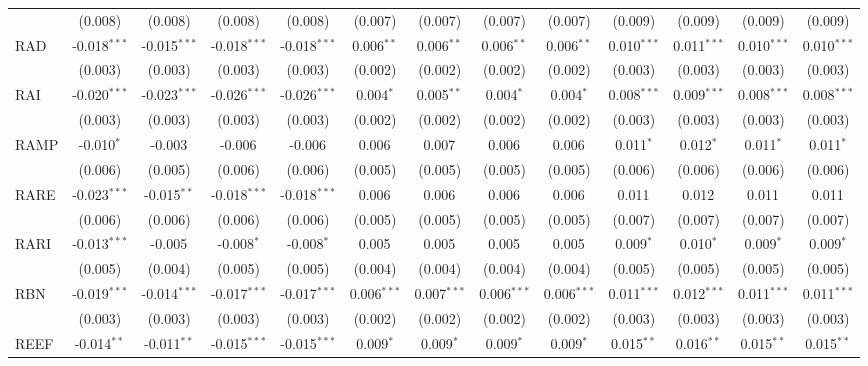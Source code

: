 \begin{table}[!htbp]
\begin{tabular}{@{\extracolsep{5pt}}lcccccccccccc}
  & (0.008) & (0.008) & (0.008) & (0.008) & (0.007) & (0.007) & (0.007) & (0.007) & (0.009) & (0.009) & (0.009) & (0.009) \\
 RAD & -0.018$^{***}$ & -0.015$^{***}$ & -0.018$^{***}$ & -0.018$^{***}$ & 0.006$^{**}$ & 0.006$^{**}$ & 0.006$^{**}$ & 0.006$^{**}$ & 0.010$^{***}$ & 0.011$^{***}$ & 0.010$^{***}$ & 0.010$^{***}$ \\
  & (0.003) & (0.003) & (0.003) & (0.003) & (0.002) & (0.002) & (0.002) & (0.002) & (0.003) & (0.003) & (0.003) & (0.003) \\
 RAI & -0.020$^{***}$ & -0.023$^{***}$ & -0.026$^{***}$ & -0.026$^{***}$ & 0.004$^{*}$ & 0.005$^{**}$ & 0.004$^{*}$ & 0.004$^{*}$ & 0.008$^{***}$ & 0.009$^{***}$ & 0.008$^{***}$ & 0.008$^{***}$ \\
  & (0.003) & (0.003) & (0.003) & (0.003) & (0.002) & (0.002) & (0.002) & (0.002) & (0.003) & (0.003) & (0.003) & (0.003) \\
 RAMP & -0.010$^{*}$ & -0.003$^{}$ & -0.006$^{}$ & -0.006$^{}$ & 0.006$^{}$ & 0.007$^{}$ & 0.006$^{}$ & 0.006$^{}$ & 0.011$^{*}$ & 0.012$^{*}$ & 0.011$^{*}$ & 0.011$^{*}$ \\
  & (0.006) & (0.005) & (0.006) & (0.006) & (0.005) & (0.005) & (0.005) & (0.005) & (0.006) & (0.006) & (0.006) & (0.006) \\
 RARE & -0.023$^{***}$ & -0.015$^{**}$ & -0.018$^{***}$ & -0.018$^{***}$ & 0.006$^{}$ & 0.006$^{}$ & 0.006$^{}$ & 0.006$^{}$ & 0.011$^{}$ & 0.012$^{}$ & 0.011$^{}$ & 0.011$^{}$ \\
  & (0.006) & (0.006) & (0.006) & (0.006) & (0.005) & (0.005) & (0.005) & (0.005) & (0.007) & (0.007) & (0.007) & (0.007) \\
 RARI & -0.013$^{***}$ & -0.005$^{}$ & -0.008$^{*}$ & -0.008$^{*}$ & 0.005$^{}$ & 0.005$^{}$ & 0.005$^{}$ & 0.005$^{}$ & 0.009$^{*}$ & 0.010$^{*}$ & 0.009$^{*}$ & 0.009$^{*}$ \\
  & (0.005) & (0.004) & (0.005) & (0.005) & (0.004) & (0.004) & (0.004) & (0.004) & (0.005) & (0.005) & (0.005) & (0.005) \\
 RBN & -0.019$^{***}$ & -0.014$^{***}$ & -0.017$^{***}$ & -0.017$^{***}$ & 0.006$^{***}$ & 0.007$^{***}$ & 0.006$^{***}$ & 0.006$^{***}$ & 0.011$^{***}$ & 0.012$^{***}$ & 0.011$^{***}$ & 0.011$^{***}$ \\
  & (0.003) & (0.003) & (0.003) & (0.003) & (0.002) & (0.002) & (0.002) & (0.002) & (0.003) & (0.003) & (0.003) & (0.003) \\
 REEF & -0.014$^{**}$ & -0.011$^{**}$ & -0.015$^{***}$ & -0.015$^{***}$ & 0.009$^{*}$ & 0.009$^{*}$ & 0.009$^{*}$ & 0.009$^{*}$ & 0.015$^{**}$ & 0.016$^{**}$ & 0.015$^{**}$ & 0.015$^{**}$ \\

\end{tabular}
\end{table}
